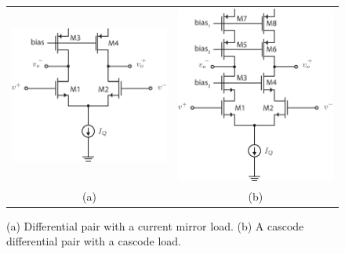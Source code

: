 \begin{figure}[tb]
\begin{center}
\begin{tabular}{cc}
\includegraphics[scale=1]{Diff_mirror_load.pdf} &
\includegraphics[scale=1]{Diff_mirror_cascode.pdf} \\
(a) & (b) \\
\end{tabular}
\end{center}
\caption{(a) Differential pair with a current mirror load.  (b) A cascode differential pair with a cascode load.} \label{fig:Diff_mirror_load.pdf}
\end{figure}


